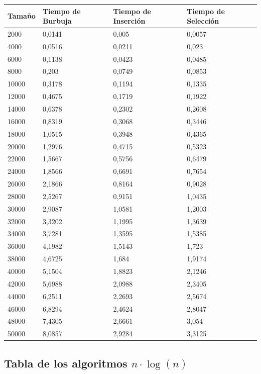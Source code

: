 \documentclass[a4paper, 11pt]{article}
\begin{document}
\begin{tabular}{|l|l|l|l|}
	\hline
	Tamaño &Tiempo de Burbuja &Tiempo de  Inserción &Tiempo de  Selección \\
	\hline
	\hline
	2000 & 0,0141 & 0,005 & 0,0057 \\
	\hline
	4000 & 0,0516 & 0,0211 & 0,023 \\
	\hline
	6000 & 0,1138 & 0,0423 & 0,0485 \\
	\hline
	8000 & 0,203 & 0,0749 & 0,0853 \\
	\hline
	10000 & 0,3178 & 0,1194 & 0,1335 \\
	\hline
	12000 & 0,4675 & 0,1719 & 0,1922 \\
	\hline
	14000 & 0,6378 & 0,2302 & 0,2608 \\
	\hline
	16000 & 0,8319 & 0,3068 & 0,3446 \\
	\hline
	18000 & 1,0515 & 0,3948 & 0,4365 \\
	\hline
	20000 & 1,2976 & 0,4715 & 0,5323 \\
	\hline
	22000 & 1,5667 & 0,5756 & 0,6479 \\
	\hline
	24000 & 1,8566 & 0,6691 & 0,7654 \\
	\hline
	26000 & 2,1866 & 0,8164 & 0,9028 \\
	\hline
	28000 & 2,5267 & 0,9151 & 1,0435 \\
	\hline
	30000 & 2,9087 & 1,0581 & 1,2003 \\
	\hline
	32000 & 3,3202 & 1,1995 & 1,3639 \\
	\hline
	34000 & 3,7281 & 1,3595 & 1,5385 \\
	\hline
	36000 & 4,1982 & 1,5143 & 1,723 \\
	\hline
	38000 & 4,6725 & 1,684 & 1,9174 \\
	\hline
	40000 & 5,1504 & 1,8823 & 2,1246 \\
	\hline
	42000 & 5,6988 & 2,0988 & 2,3405 \\
	\hline
	44000 & 6,2511 & 2,2693 & 2,5674 \\
	\hline
	46000 & 6,8294 & 2,4624 & 2,8047 \\
	\hline
	48000 & 7,4305 & 2,6661 & 3,054 \\
	\hline
	50000 & 8,0857 & 2,9284 & 3,3125 \\
	\hline
\end{tabular}

\subsection{Tabla de los algoritmos $n\cdot \log(n)$ }
\end{document}
